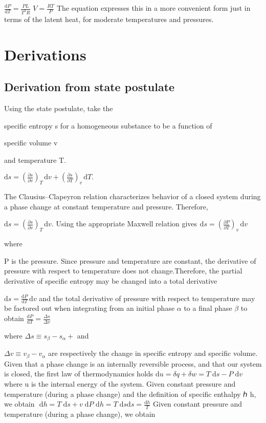 \documentclass[12pt]{report}
\renewcommand{\>}{\ensuremath >\xspace}
\newcommand{\<}{\ensuremath <\xspace}
\begin{document}
${\displaystyle {\frac {\mathrm {d} P}{\mathrm {d} T}}={\frac {PL}{T^{2}R}}}
$
${\displaystyle {V}={\frac {RT}{P}}}
$
The equation expresses this in a more convenient form just in terms of the latent heat, for moderate temperatures and pressures.

\section{Derivations}
\subsection{Derivation from state postulate}
Using the state postulate, take the

specific entropy s for a homogeneous substance to be a function of

specific volume v

and temperature T.

${\displaystyle \mathrm {d} s=\left({\frac {\partial s}{\partial v}}\right)_{T}\,\mathrm {d} v+\left({\frac {\partial s}{\partial T}}\right)_{v}\,\mathrm {d} T.}
$

The Clausius–Clapeyron relation characterizes behavior of a closed system during a phase change at constant temperature and pressure. Therefore,

${\displaystyle \mathrm {d} s=\left({\frac {\partial s}{\partial v}}\right)_{T}\,\mathrm {d} v.}
$
Using the appropriate Maxwell relation gives 
${\displaystyle \mathrm {d} s=\left({\frac {\partial P}{\partial T}}\right)_{v}\,\mathrm {d} v}
$

where 

P is the pressure. Since pressure and temperature are constant, the derivative of pressure with respect to temperature does not change.Therefore, the partial derivative of specific entropy may be changed into a total derivative

${\displaystyle \mathrm {d} s={\frac {\mathrm {d} P}{\mathrm {d} T}}\,\mathrm {d} v}
$
and the total derivative of pressure with respect to temperature may be factored out when integrating from an initial phase 
\newpage
$
\alpha
$
to a final phase 
$
\beta
$
to obtain
${\displaystyle {\frac {\mathrm {d} P}{\mathrm {d} T}}={\frac {\Delta s}{\Delta v}}}
$

where
${\displaystyle \Delta s\equiv s_{\beta }-s_{\alpha }} +
$
and 

$
\Delta v\equiv v_{\beta}-v_{\alpha}
$
are respectively the change in specific entropy and specific volume. Given that a phase change is an internally reversible process, and that our system is closed, the first law of thermodynamics holds
${\displaystyle \mathrm {d} u={\delta} q+{\delta} w=T\;\mathrm {d} s-P\;\mathrm {d} v}
$
where 
u is the internal energy of the system. Given constant pressure and temperature (during a phase change) and the definition of specific enthalpy ℎ
h, we obtain
$
$
${\displaystyle \mathrm {d} h=T\;\mathrm {d} s+v\;\mathrm {d} P}
$
${\displaystyle \mathrm {d} h=T\;\mathrm {d} s}
{\mathrm  {d}}s={\frac  {{\mathrm  {d}}h}{T}}
$
Given constant pressure and temperature (during a phase change), we obtain
\end{document}
